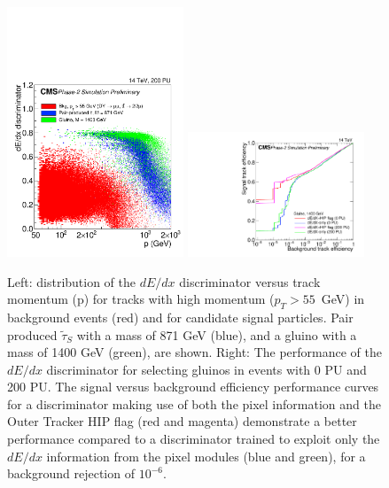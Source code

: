 \begin{figure}[h!tbp]
\begin{center}
  \includegraphics[width=0.47\textwidth]{figures/HSCP/TDR-17-001_fig6_26_a_HSCP_SpecialPlot_v2.pdf} \hfill
  \includegraphics[width=0.47\textwidth]{figures/HSCP/TDR-17-001_fig6_27_a_HSCP_Comparison_ROC_Gluino_M1400_NoPU_Super_v2.pdf}
  \caption{ Left: distribution of the $dE/dx$ discriminator versus track momentum (p) for tracks with high momentum ($p_T > 55$~GeV) in background events (red) and for candidate signal particles. Pair produced $\tilde{\tau}_S$ with a mass of 871 GeV (blue), and a gluino with a mass of 1400 GeV (green), are shown. 
Right: The performance of the $dE/dx$ discriminator for selecting gluinos in events with 0 PU and 200 PU. The signal versus background efficiency performance curves for a discriminator making use of both the pixel information and the Outer Tracker HIP flag (red and magenta) demonstrate a better performance compared to a discriminator trained to exploit only the $dE/dx$ information from the pixel modules (blue and green), for a background rejection of $10^{-6}$. 
 }
  \label{fig:cmsupgrade_hscp}
\end{center}
\end{figure}

